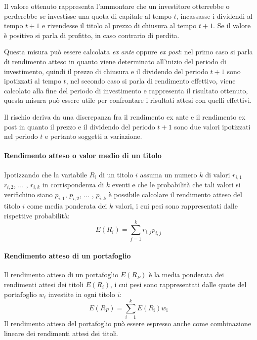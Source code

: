 Il valore ottenuto rappresenta l'ammontare che un investitore otterrebbe o perderebbe se investisse una quota di capitale al tempo $t$, incassasse i dividendi al tempo $t+1$ e rivendesse il titolo al prezzo di chiusura al tempo $t+1$. Se il valore è positivo si parla di profitto, in caso contrario di perdita. 

Questa misura può essere calcolata \textit{ex ante} oppure\textit{ ex post}: nel primo caso si parla di rendimento atteso in quanto viene determinato all'inizio del periodo di investimento, quindi il prezzo di chiusura e il dividendo del periodo $t+1$ sono  ipotizzati al tempo $t$, nel secondo caso si parla di rendimento effettivo, viene calcolato alla fine del periodo di investimento e rappresenta il risultato ottenuto, questa misura può essere utile per confrontare i risultati attesi con quelli effettivi.  

Il rischio deriva da una discrepanza fra il rendimento ex ante e il rendimento ex post in quanto il prezzo e il dividendo del periodo $t+1$ sono due valori ipotizzati nel periodo $t$ e pertanto soggetti a variazione.

\paragraph{Rendimento atteso o valor medio di un titolo }
Ipotizzando che la variabile $R_{i}$ di un titolo ${i}$ assuma un numero $k$ di valori $r_{i,1}$ $r_{i,2}$, ... , $r_{i,k}$ in corrispondenza di $k$ eventi e che le probabilità che tali valori si verifichino siano $p_{i,1}$, $p_{i,2}$, ... , $p_{i,k}$ è possibile calcolare il rendimento atteso del titolo $i$ come media ponderata dei $k$ valori, i cui pesi sono rappresentati dalle rispettive probabilità: 
\begin{equation}
\label{key}
{E(R_{i})}= \displaystyle\sum_{j=1}^k r_{i,j} p_{i,j}
\end{equation}
\paragraph{Rendimento atteso di un portafoglio}
Il rendimento atteso di un portafoglio $E(R_P)$ è la media ponderata dei rendimenti attesi dei titoli $E(R_{i})$, i cui pesi sono rappresentati dalle quote del portafoglio $w_i$ investite in ogni titolo $i$:   
\begin{equation}
\label{key}
{E(R_P)}= \displaystyle\sum_{i=1}^k E(R_\mathrm{i}) w_\mathrm{i}
\end{equation}
Il rendimento atteso del portafoglio può essere espresso anche come combinazione lineare dei rendimenti attesi dei titoli.

